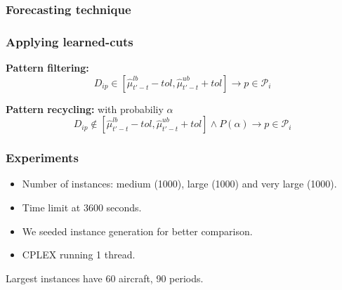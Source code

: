 \begin{frame}
\frametitle{\textbf{Forecasting technique}}


\end{frame}

\begin{frame}
\frametitle{\textbf{Applying learned-cuts}}

  \begin{block}{\textbf{Pattern filtering:}}
    \begin{equation*}
      D_{ip} \in [\hat{\mu}_{t'-t}^{lb} - tol, \hat{\mu}_{t'-t}^{ub} + tol] \rightarrow p \in \mathcal{P}_i 
    \end{equation*}
  \end{block}
  \pause

  \begin{block}{\textbf{Pattern recycling:} with probabiliy $\alpha$}
    \begin{equation*}
      D_{ip} \notin [\hat{\mu}_{t'-t}^{lb} - tol, \hat{\mu}_{t'-t}^{ub} + tol] \land P(\alpha)  \rightarrow p \in \mathcal{P}_i 
    \end{equation*}
  \end{block}
\end{frame}

\begin{frame}
\frametitle{\textbf{Experiments}}
  
  \begin{itemize}
  \item Number of instances: medium (1000), large (1000) and very large
    (1000).
  \item Time limit at 3600 seconds.
  \item We seeded instance generation for better comparison.
  \item CPLEX running 1 thread.
  \end{itemize}

  Largest instances have 60 aircraft, 90 periods.
\end{frame}

